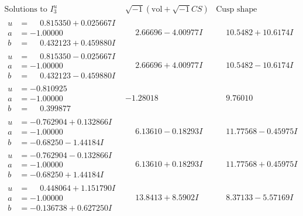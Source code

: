 \documentclass[1p]{elsarticle_modified}
\theoremstyle{definition}
\newcommand{\I}{\sqrt{-1}}
\begin{document}
$$\begin{array}{c|c|c}  
\text{Solutions to }I^u_{3}& \I (\text{vol} + \sqrt{-1}CS) & \text{Cusp shape}\\
 \hline 
\begin{aligned}
u &= \phantom{-}0.815350 + 0.025667 I \\
a &= -1.00000\phantom{ +0.000000I} \\
b &= \phantom{-}0.432123 + 0.459880 I\end{aligned}
 & \phantom{-}2.66696 - 4.00977 I & \phantom{-}10.5482 + 10.6174 I \\ \hline\begin{aligned}
u &= \phantom{-}0.815350 - 0.025667 I \\
a &= -1.00000\phantom{ +0.000000I} \\
b &= \phantom{-}0.432123 - 0.459880 I\end{aligned}
 & \phantom{-}2.66696 + 4.00977 I & \phantom{-}10.5482 - 10.6174 I \\ \hline\begin{aligned}
u &= -0.810925\phantom{ +0.000000I} \\
a &= -1.00000\phantom{ +0.000000I} \\
b &= \phantom{-}0.399877\phantom{ +0.000000I}\end{aligned}
 & -1.28018\phantom{ +0.000000I} & \phantom{-}9.76010\phantom{ +0.000000I} \\ \hline\begin{aligned}
u &= -0.762904 + 0.132866 I \\
a &= -1.00000\phantom{ +0.000000I} \\
b &= -0.68250 - 1.44184 I\end{aligned}
 & \phantom{-}6.13610 - 0.18293 I & \phantom{-}11.77568 - 0.45975 I \\ \hline\begin{aligned}
u &= -0.762904 - 0.132866 I \\
a &= -1.00000\phantom{ +0.000000I} \\
b &= -0.68250 + 1.44184 I\end{aligned}
 & \phantom{-}6.13610 + 0.18293 I & \phantom{-}11.77568 + 0.45975 I \\ \hline\begin{aligned}
u &= \phantom{-}0.448064 + 1.151790 I \\
a &= -1.00000\phantom{ +0.000000I} \\
b &= -0.136738 + 0.627250 I\end{aligned}
 & \phantom{-}13.8413 + 8.5902 I & \phantom{-}8.37133 - 5.57169 I \\ \hline\begin{aligned}

\end{aligned}
\end{array}$$
\end{document}
